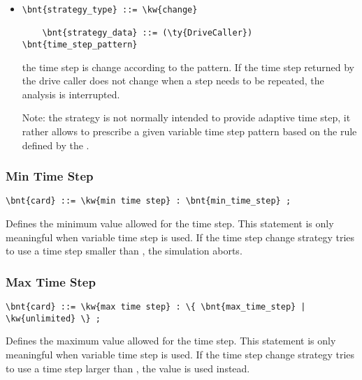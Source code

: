 \begin{itemize}
\item {}
\begin{Verbatim}[commandchars=\\\{\}]
    \bnt{strategy_type} ::= \kw{change}

    \bnt{strategy_data} ::= (\ty{DriveCaller}) \bnt{time_step_pattern}
\end{Verbatim}
the time step is change according to the  pattern.
If the time step returned by the drive caller does not change
when a step needs to be repeated, the analysis is interrupted.

Note: the  strategy is not normally intended to provide
adaptive time step, it rather allows to prescribe a given
variable time step pattern based on the rule defined
by the  .
\end{itemize}


\subsubsection{Min Time Step}
\begin{Verbatim}[commandchars=\\\{\}]
    \bnt{card} ::= \kw{min time step} : \bnt{min_time_step} ;
\end{Verbatim}
Defines the minimum value allowed for the time step.
This statement is only meaningful when variable time step is used.
If the time step change strategy tries to use a time step smaller
than , the simulation aborts.

\subsubsection{Max Time Step}
\begin{Verbatim}[commandchars=\\\{\}]
    \bnt{card} ::= \kw{max time step} : \{ \bnt{max_time_step} | \kw{unlimited} \} ;
\end{Verbatim}
Defines the maximum value allowed for the time step.
This statement is only meaningful when variable time step is used.
If the time step change strategy tries to use a time step larger
than , the value  is used instead.

